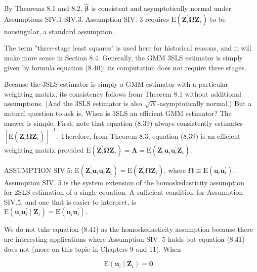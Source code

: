\documentclass[10pt]{article}
\begin{document}
By Theorems 8.1 and 8.2, $\hat{\boldsymbol{\beta}}$ is consistent and asymptotically normal under Assumptions SIV.1-SIV.3. Assumption SIV. 3 requires $\mathrm{E}\left(\mathbf{Z}_{i}^{\prime} \mathbf{\Omega Z}_{i}\right)$ to be nonsingular, a standard assumption.

The term "three-stage least squares" is used here for historical reasons, and it will make more sense in Section 8.4. Generally, the GMM 3SLS estimator is simply given by formula equation (8.40); its computation does not require three stages.

Because the 3SLS estimator is simply a GMM estimator with a particular weighting matrix, its consistency follows from Theorem 8.1 without additional assumptions. (And the 3SLS estimator is also $\sqrt{N}$-asymptotically normal.) But a natural question to ask is, When is 3SLS an efficient GMM estimator? The answer is simple. First, note that equation (8.39) always consistently estimates $\left[\mathrm{E}\left(\mathbf{Z}_{i}^{\prime} \boldsymbol{\Omega} \mathbf{Z}_{i}\right)\right]^{-1}$. Therefore, from Theorem 8.3, equation (8.39) is an efficient weighting matrix provided $\mathrm{E}\left(\mathbf{Z}_{i}^{\prime} \boldsymbol{\Omega} \mathbf{Z}_{i}\right)=\boldsymbol{\Lambda}=\mathrm{E}\left(\mathbf{Z}_{i}^{\prime} \mathbf{u}_{i} \mathbf{u}_{i}^{\prime} \mathbf{Z}_{i}\right)$.

ASSUMPTION SIV.5: $\mathrm{E}\left(\mathbf{Z}_{i}^{\prime} \mathbf{u}_{i} \mathbf{u}_{i}^{\prime} \mathbf{Z}_{i}\right)=\mathrm{E}\left(\mathbf{Z}_{i}^{\prime} \boldsymbol{\Omega} \mathbf{Z}_{i}\right)$, where $\boldsymbol{\Omega} \equiv \mathrm{E}\left(\mathbf{u}_{i} \mathbf{u}_{i}^{\prime}\right)$.\\
Assumption SIV. 5 is the system extension of the homoskedasticity assumption for 2SLS estimation of a single equation. A sufficient condition for Assumption SIV.5, and one that is easier to interpret, is\\
$\mathrm{E}\left(\mathbf{u}_{i} \mathbf{u}_{i}^{\prime} \mid \mathbf{Z}_{i}\right)=\mathrm{E}\left(\mathbf{u}_{i} \mathbf{u}_{i}^{\prime}\right)$.

We do not take equation (8.41) as the homoskedasticity assumption because there are interesting applications where Assumption SIV. 5 holds but equation (8.41) does not (more on this topic in Chapters 9 and 11). When


\begin{equation*}
\mathrm{E}\left(\mathbf{u}_{i} \mid \mathbf{Z}_{i}\right)=\mathbf{0} \tag{8.42}
\end{equation*}
\end{document}
